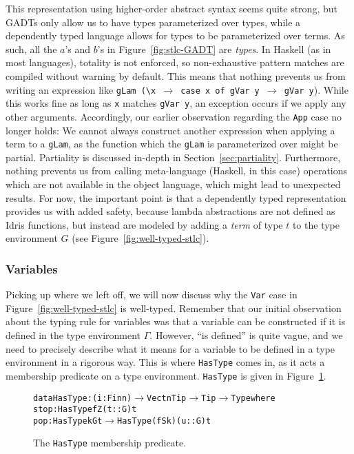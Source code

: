 This representation using higher-order abstract syntax seems quite strong, but GADTs only allow us to have types parameterized over types, while a dependently typed language allows for types to be parameterized over terms. As such, all the $a$'s and $b$'s in Figure~\ref{fig:stlc-GADT} are \emph{types}. In Haskell (as in most languages), totality is not enforced, so non-exhaustive pattern matches are compiled without warning by default. This means that nothing prevents us from writing an expression like \texttt{gLam (\textbackslash{x} $\rightarrow$ case x of gVar y $\rightarrow$ gVar y}). While this works fine as long as \texttt{x} matches \texttt{gVar y}, an exception occurs if we apply any other arguments. Accordingly, our earlier observation regarding the \texttt{App} case no longer holds: We cannot always construct another expression when applying a term to a \texttt{gLam}, as the function which the \texttt{gLam} is parameterized over might be partial. Partiality is discussed in-depth in Section~\ref{sec:partiality}. Furthermore, nothing prevents us from calling meta-language (Haskell, in this case) operations which are not available in the object language, which might lead to unexpected results. For now, the important point is that a dependently typed representation provides us with added safety, because lambda abstractions are not defined as Idris functions, but instead are modeled by adding a \emph{term} of type $t$ to the type environment $G$ (see Figure~\ref{fig:well-typed-stlc}).

\subsubsection{Variables}
Picking up where we left off, we will now discuss why the \texttt{Var} case in Figure~\ref{fig:well-typed-stlc} is well-typed. Remember that our initial observation about the typing rule for variables was that a variable can be constructed if it is defined in the type environment $\Gamma$. However, ``is defined'' is quite vague, and we need to precisely describe what it means for a variable to be defined in a type environment in a rigorous way. This is where \texttt{HasType} comes in, as it acts a membership predicate on a type environment. \texttt{HasType} is given in Figure~\ref{fig:HasType}.

\begin{figure}
\begin{alltt}
  data HasType : (i : Fin n) \(\to\) Vect n Tip \(\to\) Tip \(\to\) Type where
    stop : HasType fZ (t :: G) t
    pop  : HasType k G t \(\to\) HasType (fS k) (u :: G) t
\end{alltt}
\caption{The \texttt{HasType} membership predicate.}
\label{fig:HasType}
\end{figure}


